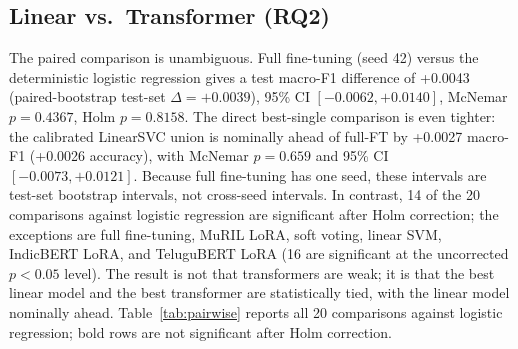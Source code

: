 \documentclass[10pt,journal]{IEEEtran}
\begin{document}
\subsection{Linear vs.\ Transformer (RQ2)}
The paired comparison is unambiguous. Full fine-tuning (seed 42) versus the deterministic logistic regression gives a test macro-F1 difference of +0.0043 (paired-bootstrap test-set $\Delta=+0.0039$), 95\% CI $[-0.0062,+0.0140]$, McNemar $p=0.4367$, Holm $p=0.8158$. The direct best-single comparison is even tighter: the calibrated LinearSVC union is nominally ahead of full-FT by +0.0027 macro-F1 (+0.0026 accuracy), with McNemar $p=0.659$ and 95\% CI $[-0.0073,+0.0121]$. Because full fine-tuning has one seed, these intervals are test-set bootstrap intervals, not cross-seed intervals. In contrast, 14 of the 20 comparisons against logistic regression are significant after Holm correction; the exceptions are full fine-tuning, MuRIL LoRA, soft voting, linear SVM, IndicBERT LoRA, and TeluguBERT LoRA (16 are significant at the uncorrected $p<0.05$ level). The result is not that transformers are weak; it is that the best linear model and the best transformer are statistically tied, with the linear model nominally ahead. Table~\ref{tab:pairwise} reports all 20 comparisons against logistic regression; bold rows are not significant after Holm correction.
\end{document}
